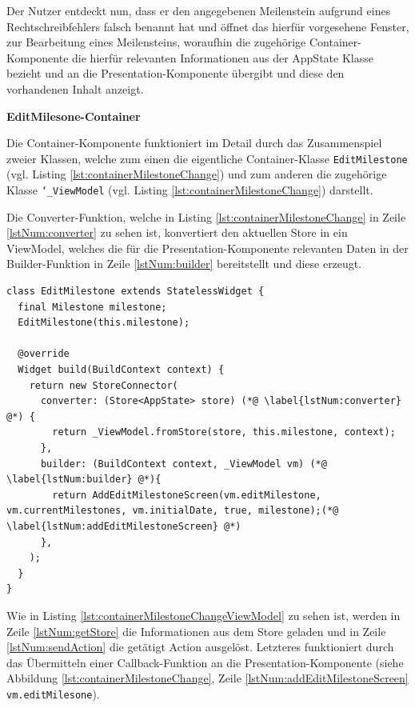 \documentclass[bibliography=totoc,listof=totoc,BCOR=5mm,DIV=12,oneside]{scrbook}
\begin{document}
\par \bigskip Der Nutzer entdeckt nun, dass er den angegebenen Meilenstein aufgrund eines Rechtschreibfehlers falsch benannt hat und öffnet das hierfür vorgesehene Fenster, zur Bearbeitung eines Meilensteins, woraufhin die zugehörige Container-Komponente die hierfür relevanten Informationen aus der AppState Klasse bezieht und an die Presentation-Komponente übergibt und diese den vorhandenen Inhalt anzeigt.

\par \bigskip \textbf{EditMilesone-Container}
\par Die Container-Komponente funktioniert im Detail durch das Zusammenspiel zweier Klassen, welche zum einen die eigentliche Container-Klasse \texttt{EditMilestone} (vgl. Listing \ref{lst:containerMilestoneChange}) und zum anderen die zugehörige Klasse \texttt{\char`_ViewModel} (vgl. Listing \ref{lst:containerMilestoneChange}) darstellt. \par Die Converter-Funktion, welche in Listing  \ref{lst:containerMilestoneChange} in Zeile \ref{lstNum:converter} zu sehen ist, konvertiert den aktuellen Store in ein ViewModel, welches die für die Presentation-Komponente relevanten Daten in der Builder-Funktion in Zeile \ref{lstNum:builder} bereitstellt und diese erzeugt.

\bigskip
\begin{lstlisting}[caption={Container-Komponente einer Meilensteinänderung},captionpos=b, label=lst:containerMilestoneChange, escapechar=!]
class EditMilestone extends StatelessWidget {
  final Milestone milestone;
  EditMilestone(this.milestone);

  @override
  Widget build(BuildContext context) {
    return new StoreConnector(
      converter: (Store<AppState> store) (*@ \label{lstNum:converter} @*) {
        return _ViewModel.fromStore(store, this.milestone, context);
      },
      builder: (BuildContext context, _ViewModel vm) (*@ \label{lstNum:builder} @*){
        return AddEditMilestoneScreen(vm.editMilestone, vm.currentMilestones, vm.initialDate, true, milestone);(*@ \label{lstNum:addEditMilestoneScreen} @*)
      },
    );
  }
}
\end{lstlisting}

\newpage
\par Wie in Listing \ref{lst:containerMilestoneChangeViewModel} zu sehen ist, werden in Zeile \ref{lstNum:getStore} die Informationen aus dem Store geladen und in Zeile \ref{lstNum:sendAction} die getätigt Action ausgelöst. Letzteres funktioniert durch das Übermitteln einer Callback-Funktion an die Presentation-Komponente (siehe Abbildung \ref{lst:containerMilestoneChange}, Zeile \ref{lstNum:addEditMilestoneScreen} \texttt{vm.editMilesone}).
\end{document}
